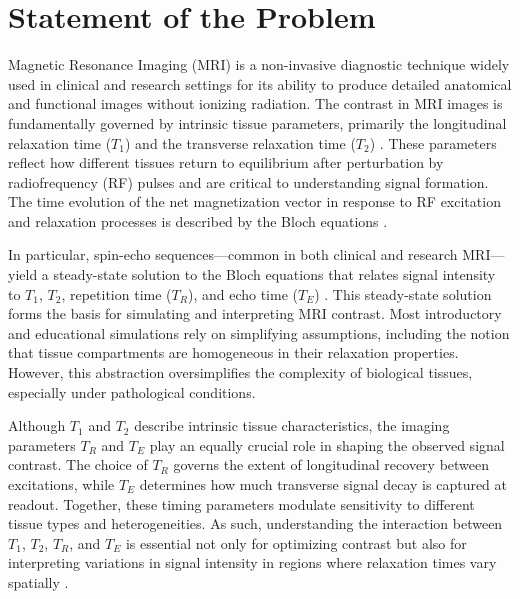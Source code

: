 \documentclass[10pt,a4paper,twoside]{article}
\begin{document}
\maketitle
\thispagestyle{titlestyle}

\section{Statement of the Problem}\label{sec:intro}
Magnetic Resonance Imaging (MRI) is a non-invasive diagnostic technique widely used in clinical and research settings for its ability to produce detailed anatomical and functional images without ionizing radiation. The contrast in MRI images is fundamentally governed by intrinsic tissue parameters, primarily the longitudinal relaxation time ($T_1$) and the transverse relaxation time ($T_2$) \cite{brown2014}. These parameters reflect how different tissues return to equilibrium after perturbation by radiofrequency (RF) pulses and are critical to understanding signal formation. The time evolution of the net magnetization vector in response to RF excitation and relaxation processes is described by the Bloch equations \cite{bloch1946}.

In particular, spin-echo sequences—common in both clinical and research MRI—yield a steady-state solution to the Bloch equations that relates signal intensity to $T_1$, $T_2$, repetition time ($T_R$), and echo time ($T_E$) \cite{bernstein2004}. This steady-state solution forms the basis for simulating and interpreting MRI contrast. Most introductory and educational simulations rely on simplifying assumptions, including the notion that tissue compartments are homogeneous in their relaxation properties. However, this abstraction oversimplifies the complexity of biological tissues, especially under pathological conditions.

Although $T_1$ and $T_2$ describe intrinsic tissue characteristics, the imaging parameters $T_R$ and $T_E$ play an equally crucial role in shaping the observed signal contrast. The choice of $T_R$ governs the extent of longitudinal recovery between excitations, while $T_E$ determines how much transverse signal decay is captured at readout. Together, these timing parameters modulate sensitivity to different tissue types and heterogeneities. As such, understanding the interaction between $T_1$, $T_2$, $T_R$, and $T_E$ is essential not only for optimizing contrast but also for interpreting variations in signal intensity in regions where relaxation times vary spatially \cite{bernstein2004}.
\end{document}
